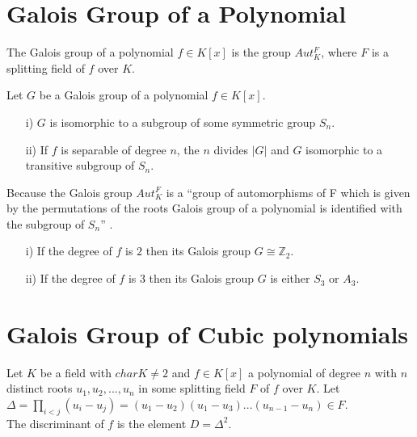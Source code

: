 \section{Galois Group of a Polynomial}
\begin{definition} \cite{hunger}
  The Galois group of a polynomial \(f \in K[x]\) is the group \(Aut_K^F\), where \(F\) is a splitting field of \(f\) over \(K\).
\end{definition}
\begin{theorem} \cite{hunger} Let \(G\) be a Galois group of a polynomial \(f \in K[x]\).
\begin{enumerate}
\item[i)] \(G\) is isomorphic to a subgroup of some symmetric group \(S_n\).
\item[ii)] If \(f\) is separable of degree \(n\), the \(n\) divides \(|G|\) and \(G\) isomorphic to a transitive subgroup of \(S_n\).  \end{enumerate}
\end{theorem}
Because the Galois group \(Aut_K^F\) is a ``group of automorphisms of F which is given by the permutations of the roots Galois group of a polynomial is identified with the subgroup of \(S_n\)'' \cite{hunger}.
\vspace{3mm}

\begin{corollary}
\begin{enumerate}
 \cite{hunger} \item[i)] If the degree of \(f\) is \(2\) then its Galois group \(G \cong {\mathbb{Z}}_2\).
  \item[ii)] If the degree of \(f\) is \(3\) then its Galois group \(G\) is either \(S_3\) or \(A_3\).
  \end{enumerate}
\end{corollary}

\section{Galois Group of Cubic polynomials}
\begin{definition} \cite{hunger}
  Let \(K\) be a field with \(char K \neq 2\) and \(f \in K[x]\) a polynomial of degree \(n\) with \(n\) distinct roots \(u_1,u_2,...,u_n\) in some splitting field \(F\) of \(f\) over \(K\). Let \(\Delta = \prod\limits_{i<j}(u_i-u_j) = (u_1-u_2)(u_1-u_3)...(u_{n-1}-u_n) \in F\).\\
  The discriminant of \(f\) is the element \(D= {\Delta}^2\).
\end{definition}

